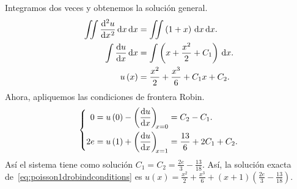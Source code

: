 \begin{solution}
      Integramos dos veces y obtenemos la solución general.
      \begin{align*}
            \iint
            \diff[2]{u}{x}
            \dl x
            \dl x           & =
            \iint
            \left(1+x\right)
            \dl x
            \dl x.              \\
            \int
            \diff{u}{x}
            \dl x           & =
            \int
            \left(x+\frac{x^{2}}{2}+C_{1}\right)
            \dl x.              \\
            u\left(x\right) & =
            \frac{x^{2}}{2}+\frac{x^{3}}{6}+C_{1}x+C_{2}.
      \end{align*}
      Ahora, apliquemos las condiciones de frontera Robin.
      \begin{equation}
            \left\{
            \begin{aligned}
                  0
                   & =
                  u\left(0\right)-
                  \diff{u}{x}[x=0]=
                  C_{2}-C_{1}. \\
                  2e
                   & =
                  u\left(1\right)+
                  \diff{u}{x}[x=1]=
                  \frac{13}{6}+2C_{1}+C_{2}.
            \end{aligned}
            \right.
      \end{equation}
      Así el sistema tiene como solución
      $C_{1}=C_{2}=\frac{2e}{3}-\frac{13}{18}$.
      Así, la solución exacta
      de~\eqref{eq:poisson1drobindconditions} es
      \begin{math}
            u\left(x\right)=
            \frac{x^{2}}{2}+\frac{x^{3}}{6}+
            \left(x+1\right)\left(\frac{2e}{3}-\frac{13}{18}\right)
      \end{math}.
\end{solution}

